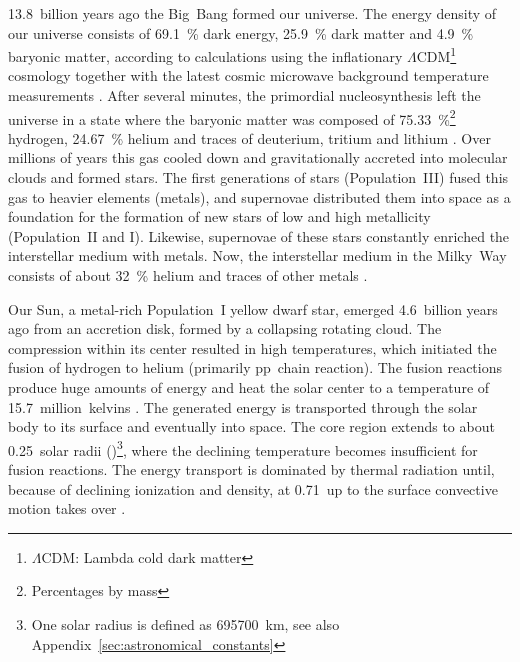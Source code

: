 13.8~billion years ago the Big~Bang formed our universe. The energy density of our universe consists of \SI{69.1}{\percent} dark energy, \SI{25.9}{\percent} dark matter and \SI{4.9}{\percent} baryonic matter, according to calculations using the inflationary $\Lambda$CDM\footnote{$\Lambda$CDM: Lambda cold dark matter} cosmology together with the latest cosmic microwave background temperature measurements \citep{Planck2016}.
After several minutes, the primordial nucleosynthesis left the universe in a state where the baryonic matter was composed of \SI{75.33}{\percent}\footnote{Percentages by mass} hydrogen, \SI{24.67}{\percent} helium and traces of deuterium, tritium and lithium \citep{Planck2016}.
Over millions of years this gas cooled down and gravitationally accreted into molecular clouds and formed stars. The first generations of stars (Population~III) fused this gas to heavier elements (metals), and supernovae distributed them into space as a foundation for the formation of new stars of low and high metallicity (Population~II and I). Likewise, supernovae of these stars constantly enriched the interstellar medium with metals. Now, the interstellar medium in the Milky~Way consists of about \SI{32}{\percent} helium and traces of other metals \citep{Danziger1970}.

Our Sun, a metal-rich Population~I yellow dwarf star, emerged 4.6~billion years ago \citep{Bahcall1995} from an accretion disk, formed by a collapsing rotating cloud. The compression within its center resulted in high temperatures, which initiated the fusion of hydrogen to helium (primarily pp~chain reaction). The fusion reactions produce huge amounts of energy and heat the solar center to a temperature of 15.7~million~kelvins \citep{Christensen-Dalsgaard1996}. The generated energy is transported through the solar body to its surface and eventually into space.
The core region extends to about 0.25~solar radii (\Rsun)\footnote{One solar radius is defined as \SI{695700}{\km}, see also Appendix~\ref{sec:astronomical_constants}}, where the declining temperature becomes insufficient for fusion reactions. The energy transport is dominated by thermal radiation until, because of declining ionization and density, at 0.71\,\Rsun{} up to the surface convective motion takes over \citep{Christensen-Dalsgaard1991}. %

